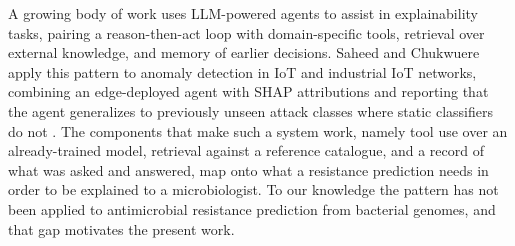 A growing body of work uses LLM-powered agents to assist in explainability tasks, pairing a reason-then-act loop with domain-specific tools, retrieval over external knowledge, and memory of earlier decisions. Saheed and Chukwuere apply this pattern to anomaly detection in IoT and industrial IoT networks, combining an edge-deployed agent with SHAP attributions and reporting that the agent generalizes to previously unseen attack classes where static classifiers do not \cite{saheed2026llmagent}. The components that make such a system work, namely tool use over an already-trained model, retrieval against a reference catalogue, and a record of what was asked and answered, map onto what a resistance prediction needs in order to be explained to a microbiologist. To our knowledge the pattern has not been applied to antimicrobial resistance prediction from bacterial genomes, and that gap motivates the present work.
